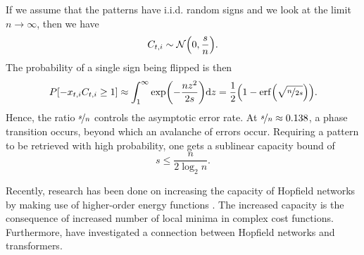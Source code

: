 If we assume that the patterns have i.i.d. random signs and we look at the limit $n \to \infty$,
then we have \[
    C_{t,i} \sim \mathcal{N}\lft( 0, \frac{s}{n} \rgt).
\]
The probability of a single sign being flipped is then \[
    P[-x_{t,i} C_{t,i} \geq 1] \approx \int_1^{\infty} \exp \lft( - \frac{nz^2}{2s} \rgt) \mathrm{d}z = \frac{1}{2} \lft( 1 - \mathrm{erf}\lft( \sqrt{\nicefrac{n}{2s}} \rgt) \rgt).
\]
Hence, the ratio $\nicefrac{s}{n}$ controls the asymptotic error rate. At $\nicefrac{s}{n} \approx
    0.138$, a phase transition occurs, beyond which an avalanche of errors occur. Requiring a pattern
to be retrieved with high probability, one gets a sublinear capacity bound of \[
    s \leq \frac{n}{2 \log_2 n}.
\]

Recently, research has been done on increasing the capacity of Hopfield networks by making use of
higher-order energy functions \citep{krotov2016dense,demircigil2017model}. The increased capacity
is the consequence of increased number of local minima in complex cost functions. Furthermore,
\citet{ramsauer2020hopfield} have investigated a connection between Hopfield networks and
transformers.
